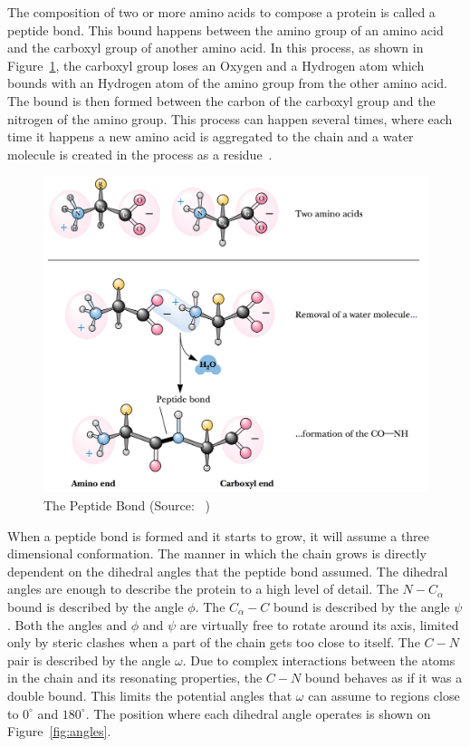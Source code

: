The composition of two or more amino acids to compose a protein is called
a peptide bond. This bound happens between the amino group of an amino acid
and the carboxyl group of another amino acid. In this process, as shown in
Figure~\ref{fig:peptide-bond}, the carboxyl group loses an Oxygen and a Hydrogen
atom which bounds with an Hydrogen atom of the amino group from the other amino
acid. The bound is then formed between the carbon of the carboxyl group and the
nitrogen of the amino group. This process can happen several times, where each
time it happens a new amino acid is aggregated to the chain and a water
molecule is created in the process as a residue~\cite{garrett1999biochemistry}.

\begin{figure}
    \centering
    \includegraphics[width=\textwidth]{Figuras/peptide-bond.png}
    \caption{The Peptide Bond (Source: ~\cite{garrett1999biochemistry})}
    \label{fig:peptide-bond}
\end{figure}

When a peptide bond is formed and it starts to grow, it will assume a three
dimensional conformation. The manner in which the chain grows is directly
dependent on the dihedral angles that the peptide bond assumed. The dihedral
angles are enough to describe the protein to a high level of detail. The $N -
C_\alpha$ bound is described by the angle $\phi$. The $C_\alpha - C$ bound is
described by the angle $\psi$. Both the angles and $\phi$ and $\psi$ are
virtually free to rotate around its axis, limited only by steric clashes when a
part of the chain gets too close to itself. The $C - N$ pair is described by
the angle $\omega$. Due to complex interactions between the atoms in the chain
and its resonating properties, the $C - N$ bound behaves as if it was a double
bound. This limits the potential angles that $\omega$ can assume to regions
close to $0^{\circ}$ and $180^{\circ}$. The position where each dihedral angle
operates is shown on
Figure~\ref{fig:angles}.

